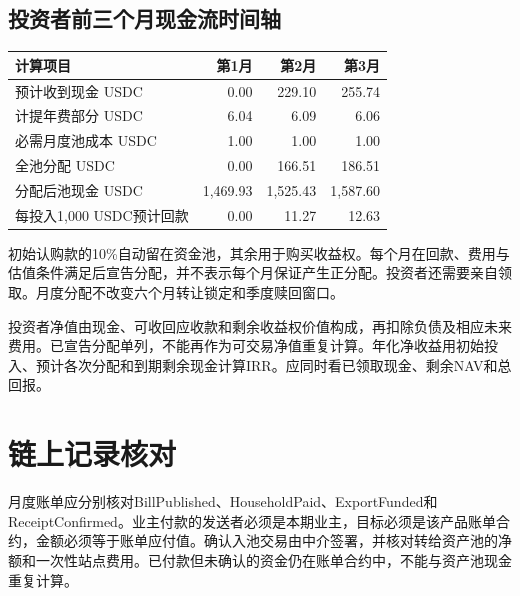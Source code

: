 \documentclass[12pt,a4paper]{article}
\begin{document}
\clearpage\begin{landscape}
\subsection{投资者前三个月现金流时间轴}
\begin{center}\end{center}\begin{center}\begin{tabular}{L{11cm}rrr}\toprule 计算项目 & 第1月 & 第2月 & 第3月\\\midrule
预计收到现金 USDC & 0.00 & 229.10 & 255.74\\
计提年费部分 USDC & 6.04 & 6.09 & 6.06\\
必需月度池成本 USDC & 1.00 & 1.00 & 1.00\\
全池分配 USDC & 0.00 & 166.51 & 186.51\\
分配后池现金 USDC & 1,469.93 & 1,525.43 & 1,587.60\\
每投入1,000 USDC预计回款 & 0.00 & 11.27 & 12.63\\\bottomrule\end{tabular}\end{center}
初始认购款的10\%自动留在资金池，其余用于购买收益权。每个月在回款、费用与估值条件满足后宣告分配，并不表示每个月保证产生正分配。投资者还需要亲自领取。月度分配不改变六个月转让锁定和季度赎回窗口。

投资者净值由现金、可收回应收款和剩余收益权价值构成，再扣除负债及相应未来费用。已宣告分配单列，不能再作为可交易净值重复计算。年化净收益用初始投入、预计各次分配和到期剩余现金计算IRR。应同时看已领取现金、剩余NAV和总回报。

\end{landscape}
\clearpage\section{链上记录核对}
月度账单应分别核对BillPublished、HouseholdPaid、ExportFunded和ReceiptConfirmed。业主付款的发送者必须是本期业主，目标必须是该产品账单合约，金额必须等于账单应付值。确认入池交易由中介签署，并核对转给资产池的净额和一次性站点费用。已付款但未确认的资金仍在账单合约中，不能与资产池现金重复计算。
\end{document}
